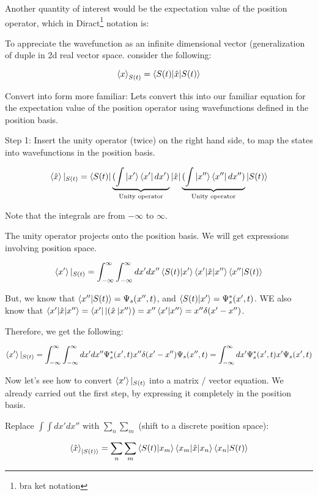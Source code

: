 \documentclass{article}
\begin{document}
Another quantity of interest would be the expectation value of the position operator, which in Diract\footnote{bra ket notation} notation is:


To appreciate the wavefunction as an infinite dimensional vector (generalization of duple in 2d real vector space. consider the following:

$$\braket{x}_{S(t)} = \braket{S(t)|\hat{x}|S(t)}$$

Convert into form more familiar: Lets convert this into our familiar equation for the expectation value of the position operator using wavefunctions defined in the position basis.

Step 1: Insert the unity operator (twice) on the right hand side, to map the states into wavefunctions in the position basis. 
    
    $$\braket{\hat{x}}|_{S(t)} = \braket{S(t)| \underbrace{(\int \ket{x'} \bra{x'} dx')}_{\text{Unity operator}} |\hat{x}| \underbrace{(\int \ket{x''} \bra{x''} dx'')}_{\text{Unity operator}} |S(t)}$$
    
    Note that the integrals are from $-\infty$ to $\infty$. 
    
    The unity operator projects onto the position basis. We will get expressions involving position space. 
    
    $$\braket{x'}|_{S(t)} = \int_{- \infty}^\infty \int_{- \infty}^\infty dx' dx'' \braket{S(t)|x'} \braket{x'|\hat{x}|x''} \braket{x''|S(t)}$$
    
    But, we know that $\braket{x'' | S(t)} = \Psi_s (x'',t)$, and $\braket{S(t)|x'} = \Psi_s^* (x',t)$. WE also know that $\braket{x'|\hat{x}|x''} = \bra{x'}|(\hat{x} \ket{x''}) = x'' \braket{x'|x''} = x'' \delta(x' - x'')$. 
    
    Therefore, we get the following:
    
    $$\braket{x'}|_{S(t)} = \int_{- \infty}^\infty \int_{- \infty}^\infty dx' dx'' \Psi_s^* (x',t) x'' \delta(x' - x'') \Psi_s (x'',t) = \int_{- \infty}^\infty dx' \Psi_s^* (x',t) x' \Psi_s (x',t)$$
    
Now let's see how to convert $\braket{x'}|_{S(t)}$ into a matrix / vector equation. We already carried out the first step, by expressing it completely in the position basis. 


Replace $\int \int dx' dx''$ with $\sum_n \sum_m$ (shift to a discrete position space):

$$\braket{\hat{x}}_{\ket{S(t)}} = \sum_n \sum_m \braket{S(t)|x_m} \braket{x_m|\hat{x}|x_n} \braket{x_n|S(t)}$$
\end{document}
